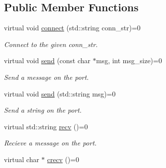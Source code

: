 \subsection*{Public Member Functions}
\begin{DoxyCompactItemize}
\item 
virtual void \hyperlink{classZmqOut_ae34b1742c72e0c82ea42315cb68f1a20}{connect} (std\+::string conn\+\_\+str)=0\hypertarget{classZmqOut_ae34b1742c72e0c82ea42315cb68f1a20}{}\label{classZmqOut_ae34b1742c72e0c82ea42315cb68f1a20}

\begin{DoxyCompactList}\small\item\em Connect to the given conn\+\_\+str. \end{DoxyCompactList}\item 
virtual void \hyperlink{classZmqOut_a97935d9e7cbacd2fcb9655433e4b7af4}{send} (const char $\ast$msg, int msg\+\_\+size)=0\hypertarget{classZmqOut_a97935d9e7cbacd2fcb9655433e4b7af4}{}\label{classZmqOut_a97935d9e7cbacd2fcb9655433e4b7af4}

\begin{DoxyCompactList}\small\item\em Send a message on the port. \end{DoxyCompactList}\item 
virtual void \hyperlink{classZmqOut_ac7b314ddf6e0357c31b05fb2b1b91635}{send} (std\+::string msg)=0\hypertarget{classZmqOut_ac7b314ddf6e0357c31b05fb2b1b91635}{}\label{classZmqOut_ac7b314ddf6e0357c31b05fb2b1b91635}

\begin{DoxyCompactList}\small\item\em Send a string on the port. \end{DoxyCompactList}\item 
virtual std\+::string \hyperlink{classZmqOut_a02da5e5dd51f99e7d35a3f843b9bd00e}{recv} ()=0\hypertarget{classZmqOut_a02da5e5dd51f99e7d35a3f843b9bd00e}{}\label{classZmqOut_a02da5e5dd51f99e7d35a3f843b9bd00e}

\begin{DoxyCompactList}\small\item\em Recieve a message on the port. \end{DoxyCompactList}\item 
virtual char $\ast$ \hyperlink{classZmqOut_ab2f09b3e006ab0080f3c54b0ccd8ae1d}{crecv} ()=0\hypertarget{classZmqOut_ab2f09b3e006ab0080f3c54b0ccd8ae1d}{}\label{classZmqOut_ab2f09b3e006ab0080f3c54b0ccd8ae1d}


\end{DoxyCompactItemize}
